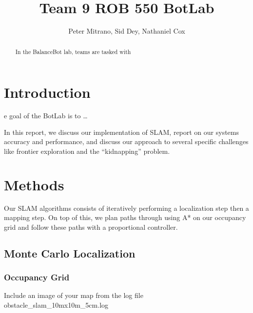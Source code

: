 \documentclass[journal]{IEEEtran}
\begin{document}
\title{Team 9 ROB 550 BotLab}

\author{Peter Mitrano, Sid Dey, Nathaniel Cox}

\maketitle

\begin{abstract}
In the BalanceBot lab, teams are tasked with
\end{abstract}
\IEEEpeerreviewmaketitle

\section{Introduction}
e goal of the BotLab is to \dots

In this report, we discuss our implementation of SLAM, report on our systems accuracy and performance, and discuss our approach to several specific challenges like frontier exploration and the ``kidnapping'' problem.

\section{Methods}

Our SLAM algorithms consists of iteratively performing a localization step then a mapping step. On top of this, we plan paths through using A* on our occupancy grid and follow these paths with a proportional controller.
\subsection{Monte Carlo Localization}

\subsubsection{Occupancy Grid}

Include an image of your map from the log file obstacle\_slam\_10mx10m\_5cm.log
\end{document}
